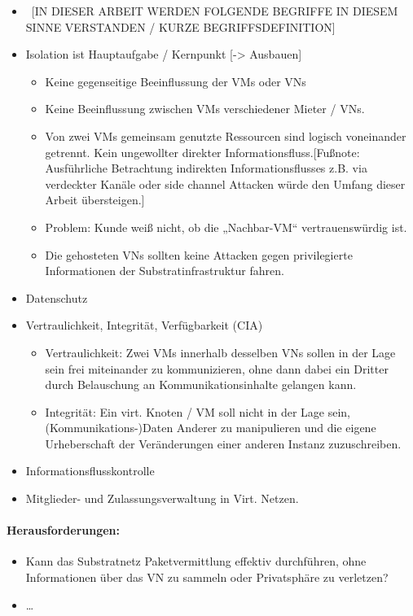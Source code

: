 \begin{itemize}
\item ~[IN DIESER ARBEIT WERDEN FOLGENDE BEGRIFFE IN DIESEM SINNE VERSTANDEN / KURZE BEGRIFFSDEFINITION]
\item Isolation ist Hauptaufgabe / Kernpunkt [-> Ausbauen]	
	\begin{itemize}
	\item Keine gegenseitige Beeinflussung der VMs oder VNs
	\item Keine Beeinflussung zwischen VMs verschiedener Mieter / VNs.
	\item Von zwei VMs gemeinsam genutzte Ressourcen sind logisch voneinander getrennt. Kein ungewollter direkter Informationsfluss.[Fußnote: Ausführliche Betrachtung indirekten Informationsflusses z.B. via verdeckter Kanäle oder side channel Attacken würde den Umfang dieser Arbeit übersteigen.]
	\item Problem: Kunde weiß nicht, ob die „Nachbar-VM“ vertrauenswürdig ist.
	\item Die gehosteten VNs sollten keine Attacken gegen privilegierte Informationen der Substratinfrastruktur fahren.
	\end{itemize}
\item	Datenschutz
\item	Vertraulichkeit, Integrität, Verfügbarkeit (CIA)
	\begin{itemize}
	\item Vertraulichkeit: Zwei VMs innerhalb desselben VNs sollen in der Lage sein frei miteinander zu kommunizieren, ohne dann dabei ein Dritter durch Belauschung an Kommunikationsinhalte gelangen kann.
	\item Integrität: Ein virt. Knoten / VM soll nicht in der Lage sein, (Kommunikations-)Daten Anderer zu manipulieren und die eigene Urheberschaft der Veränderungen einer anderen Instanz zuzuschreiben. 
	\end{itemize}
\item	Informationsflusskontrolle
\item	Mitglieder- und Zulassungsverwaltung in Virt. Netzen.
\end{itemize}

\paragraph*{Herausforderungen:} %
\begin{itemize}
	\item Kann das Substratnetz Paketvermittlung effektiv durchführen, ohne Informationen über das VN zu sammeln oder Privatsphäre zu verletzen?
	\item \dots
\end{itemize}